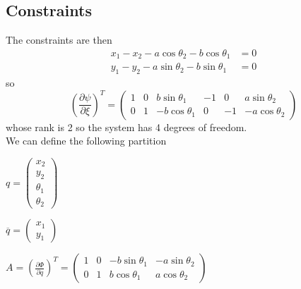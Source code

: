\subsection{Constraints}
The constraints are then
\begin{align}
x_1 - x_2 - a\cos\theta_2 - b\cos\theta_1 &= 0\\
y_1 - y_2 - a\sin\theta_2 - b\sin\theta_1 &= 0
\end{align}
so
$$(\frac{\partial \psi}{\partial \xi})^T = \left( \begin{array}{cccccc}
1 &  0 & b\sin\theta_1  & -1 & 0 & a\sin\theta_2\\
0 & 1 & -b\cos\theta_1 & 0 & -1 & -a\cos\theta_2
\end{array} \right)$$
whose rank is 2 so the system has 4 degrees of freedom. \\

We can define the following partition

$q = \left( \begin{array}{c}
x_2\\
y_2\\
\theta_1\\
\theta_2
\end{array} \right)$

$\overline{q} = \left( \begin{array}{c}
x_1\\
y_1
\end{array} \right)$

$ A = (\frac{\partial \Phi}{\partial q})^T = \left( \begin{array}{cccc}
1 & 0 & -b\sin\theta_1 & -a\sin\theta_2\\
0 & 1 & b\cos\theta_1 & a\cos\theta_2
\end{array} \right)$

